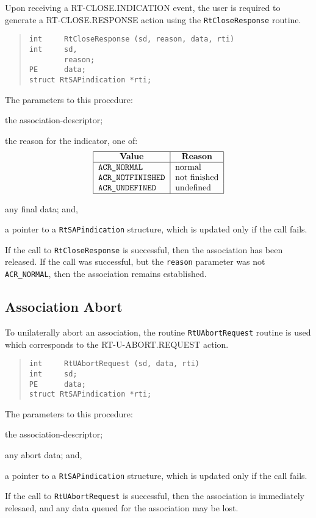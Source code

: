 Upon receiving a {\sf RT-CLOSE.INDICATION\/} event,
the user is required to generate a {\sf RT-CLOSE.RESPONSE\/} action
using the \verb"RtCloseResponse" routine.
\begin{quote}\small\begin{verbatim}
int     RtCloseResponse (sd, reason, data, rti)
int     sd,
        reason;
PE      data;
struct RtSAPindication *rti;
\end{verbatim}\end{quote}
The parameters to this procedure:
\begin{describe}
\item[\verb"sd":] the association-descriptor;

\item[\verb"reason":] the reason for the indicator,
one of:
\[\begin{tabular}{|l|l|}
\hline
    \multicolumn{1}{|c|}{\bf Value}&
		\multicolumn{1}{c|}{\bf Reason}\\
\hline
    \tt ACR\_NORMAL&		normal\\
    \tt ACR\_NOTFINISHED&	not finished\\
    \tt ACR\_UNDEFINED&		undefined\\
\hline
\end{tabular}\]

\item[\verb"data":] any final data;
and,

\item[\verb"rti":] a pointer to a \verb"RtSAPindication" structure,
which is updated only if the call fails.
\end{describe}
If the call to \verb"RtCloseResponse" is successful,
then the association has been released.
If the call was successful,
but the \verb"reason" parameter was not \verb"ACR_NORMAL",
then the association remains established.

\subsection	{Association Abort}
To unilaterally abort an association,
the routine \verb"RtUAbortRequest" routine is used
which corresponds to the {\sf RT-U-ABORT.REQUEST\/} action.
\begin{quote}\small\begin{verbatim}
int     RtUAbortRequest (sd, data, rti)
int     sd;
PE      data;
struct RtSAPindication *rti;
\end{verbatim}\end{quote}
The parameters to this procedure:
\begin{describe}
\item[\verb"sd":] the association-descriptor;

\item[\verb"data":] any abort data;
and,

\item[\verb"rti":] a pointer to a \verb"RtSAPindication" structure,
which is updated only if the call fails.
\end{describe}
If the call to \verb"RtUAbortRequest" is successful,
then the association is immediately relesaed,
and any data queued for the association may be lost.

